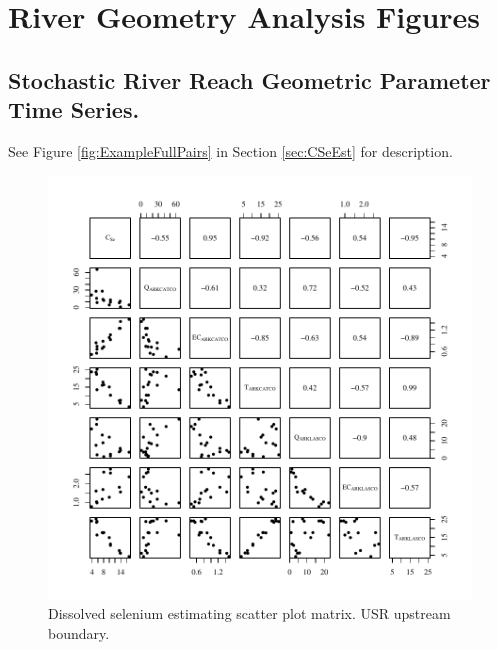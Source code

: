 \renewcommand{\thechapter}{C}

\chapter{River Geometry Analysis Figures}
\section{Stochastic River Reach Geometric Parameter Time Series.}
\label{App:Scatterplots}

See Figure \ref{fig:ExampleFullPairs} in Section \ref{sec:CSeEst} for description.

\begin{figure}[htbp]
	\begin{center}
	\includegraphics[width=6in]{"Figures/Results_USR/Conc Model Full PairsU163"}
	\caption{Dissolved selenium estimating scatter plot matrix.  USR upstream boundary.}
	\end{center}
\end{figure}

